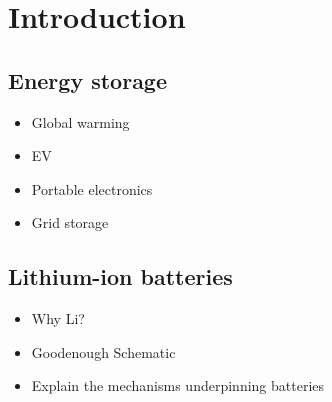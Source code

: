 \chapter{Introduction}
\section{Energy storage}
\begin{itemize}
	\item Global warming
	\item EV
	\item Portable electronics
	\item Grid storage
\end{itemize}
\section{Lithium-ion batteries}
\begin{itemize}
	\item Why Li?
	\item Goodenough Schematic
	\item Explain the mechanisms underpinning batteries
\end{itemize}

